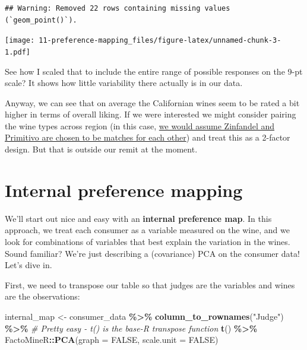 \documentclass[
]{book}
\newenvironment{Shaded}{\begin{snugshade}}{\end{snugshade}}
\newcommand{\AttributeTok}[1]{\textcolor[rgb]{0.13,0.29,0.53}{#1}}
\newcommand{\CommentTok}[1]{\textcolor[rgb]{0.56,0.35,0.01}{\textit{#1}}}
\newcommand{\ConstantTok}[1]{\textcolor[rgb]{0.56,0.35,0.01}{#1}}
\newcommand{\FunctionTok}[1]{\textcolor[rgb]{0.13,0.29,0.53}{\textbf{#1}}}
\newcommand{\NormalTok}[1]{#1}
\newcommand{\OtherTok}[1]{\textcolor[rgb]{0.56,0.35,0.01}{#1}}
\newcommand{\SpecialCharTok}[1]{\textcolor[rgb]{0.81,0.36,0.00}{\textbf{#1}}}
\newcommand{\StringTok}[1]{\textcolor[rgb]{0.31,0.60,0.02}{#1}}
\begin{document}
\begin{verbatim}
## Warning: Removed 22 rows containing missing values (`geom_point()`).
\end{verbatim}

\texttt{[image: 11-preference-mapping\_files/figure-latex/unnamed-chunk-3-1.pdf]}

See how I scaled that to include the entire range of possible responses on the 9-pt scale? It shows how little variability there actually is in our data.

Anyway, we can see that on average the Californian wines seem to be rated a bit higher in terms of overall liking. If we were interested we might consider pairing the wine types across region (in this case, \href{https://en.wikipedia.org/wiki/Zinfandel}{we would assume Zinfandel and Primitivo are chosen to be matches for each other}) and treat this as a 2-factor design. But that is outside our remit at the moment.

\section{Internal preference mapping}\label{internal-preference-mapping}

We'll start out nice and easy with an \textbf{internal preference map}. In this approach, we treat each consumer as a variable measured on the wine, and we look for combinations of variables that best explain the variation in the wines. Sound familiar? We're just describing a (covariance) PCA on the consumer data! Let's dive in.

First, we need to transpose our table so that judges are the variables and wines are the observations:

\begin{Shaded}
\begin{Highlighting}[]
\NormalTok{internal\_map }\OtherTok{\textless{}{-}} 
\NormalTok{  consumer\_data }\SpecialCharTok{\%\textgreater{}\%}
  \FunctionTok{column\_to\_rownames}\NormalTok{(}\StringTok{"Judge"}\NormalTok{) }\SpecialCharTok{\%\textgreater{}\%}
  \CommentTok{\# Pretty easy {-} \textasciigrave{}t()\textasciigrave{} is the base{-}\textasciigrave{}R\textasciigrave{} transpose function}
  \FunctionTok{t}\NormalTok{() }\SpecialCharTok{\%\textgreater{}\%}
\NormalTok{  FactoMineR}\SpecialCharTok{::}\FunctionTok{PCA}\NormalTok{(}\AttributeTok{graph =} \ConstantTok{FALSE}\NormalTok{, }\AttributeTok{scale.unit =} \ConstantTok{FALSE}\NormalTok{)}
\end{Highlighting}
\end{Shaded}
\end{document}
